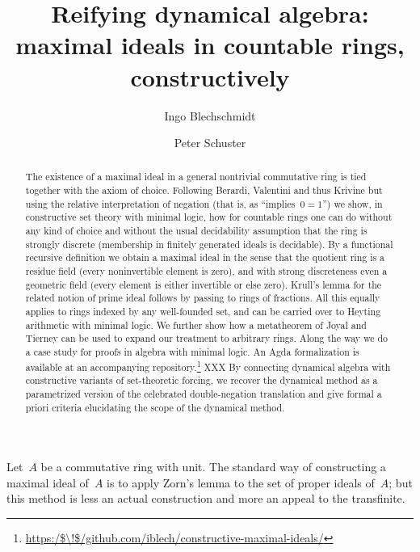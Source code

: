 \documentclass[envcountsect,envcountsame,runningheads]{llncs}
\renewcommand{\_}{\mathpunct{.}\,}
\begin{document}
\title{Reifying dynamical algebra: \\ maximal ideals in countable rings, constructively}
\author{Ingo Blechschmidt \and Peter Schuster}

\maketitle

\begin{abstract}
  The existence of a maximal ideal in a general nontrivial commutative
  ring is tied together with the axiom of choice.
  Following Berardi, Valentini and thus Krivine but using the relative interpretation of
  negation (that is, as ``implies~$0=1$'') we show, in constructive set theory with
  minimal logic, how for countable rings one can do without any kind of choice
  and without the usual decidability assumption that the ring is strongly
  discrete (membership in finitely generated ideals is decidable).
  By a functional
  recursive definition we obtain a maximal ideal in the sense that the quotient ring is a residue field
  (every noninvertible element is zero), and with strong discreteness
  even a geometric field (every element is either invertible or
  else zero). Krull's lemma for the related notion of prime ideal follows by
  passing to rings of fractions. All this equally applies to rings indexed by any well-founded set, and can be carried over to Heyting
  arithmetic with minimal logic.
  We further show how a metatheorem of Joyal and Tierney can be used to expand our
  treatment to arbitrary rings. Along the way we do a case study for proofs in
  algebra with minimal logic. An Agda formalization is available at an
  accompanying repository.\footnote{\url{https:/$\!$/github.com/iblech/constructive-maximal-ideals/}}
  XXX
  By connecting dynamical algebra with constructive variants of set-theoretic
  forcing, we recover the dynamical method as a parametrized version of the
  celebrated double-negation translation and give formal a priori criteria
  elucidating the scope of the dynamical method.
\end{abstract}

\noindent
Let~$A$ be a commutative ring with unit. The standard way of constructing a
maximal ideal of~$A$ is to apply Zorn's lemma to the set of proper ideals
of~$A$; but this method is less an actual construction and more an appeal to
the transfinite.
\end{document}

